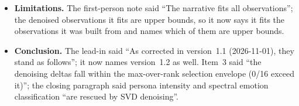 \documentclass[11pt,a4paper]{article}
\begin{document}
\begin{itemize}[nosep]
  spectral features. This enables monitoring for persona drift or emotional
  state changes that manifest in spectral shape'', recommending a method
  whose gains are untested. It is now a proposal, not recommended for
  deployment until a confirmatory test.
\item \textbf{Limitations.} The first-person note said ``The narrative
  fits all observations''; the denoised observations it fits are upper
  bounds, so it now says it fits the observations it was built from and
  names which of them are upper bounds.
\item \textbf{Conclusion.} The lead-in said ``As corrected in
  version~1.1 (2026-11-01), they stand as follows''; it now names
  version~1.2 as well. Item~3 said ``the denoising deltas fall within
  the max-over-rank selection envelope (0/16 exceed it)''; the closing
  paragraph said persona intensity and spectral emotion classification
  ``are rescued by SVD denoising''.
\end{itemize}
\end{document}
